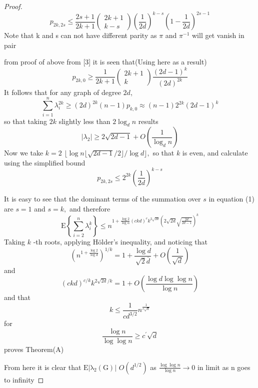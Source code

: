 \documentclass[oneside]{book}
\begin{document}
\begin{proof}
$$
p_{2 k, 2 s} \leq \frac{2 s+1}{2 k+1}\left(\begin{array}{c}
2 k+1 \\
k-s
\end{array}\right)\left(\frac{1}{2 d}\right)^{k-s}\left(1-\frac{1}{2 d}\right)^{2 s-1}
$$
 Note that k and s can not have different parity as  $\pi$ and $\pi^{-1}$ will get vanish in pair\par
   from proof of above from [3] it is seen that(Using here as a result)  
$$ p_{2 k, 0} \geq \frac{1}{2 k+1}\left(\begin{array}{c}
2 k+1 \\
k
\end{array}\right) \frac{(2 d-1)^{k}}{(2 d)^{2 k}}$$
It follows that for any graph of degree $2 d$,
$$
\sum_{i=1}^{n} \lambda_{i}^{2 k} \geq(2 d)^{2 k}(n-1) p_{k, 0} \approx(n-1) 2^{2 k}(2 d-1)^{k}
$$
so that taking $2 k$ slightly less than $2 \log _{d} n$ results 
$$
\left|\lambda_{2}\right| \geq 2 \sqrt{2 d-1}+O\left(\frac{1}{\log _{d} n}\right)
$$
Now we take $k=2$ $\lfloor\log n\lfloor\sqrt{2 d-1} / 2\rfloor / \log d\rfloor,$ so that $k$ is even, and calculate
using the simplified bound
$$
p_{2 k, 2 s} \leq 2^{2 k}\left(\frac{1}{2 d}\right)^{k-s}
$$

It is easy to see that the dominant terms of the summation over $s$ in equation (1) are $s=1$ and $s=k,$ and therefore
$$
\mathrm{E}\left\{\sum_{i=2}^{n} \lambda_{i}^{k}\right\} \leq n^{1+\frac{\log 2}{\log \alpha}(c k d)^{c} k^{2 \sqrt{2 d}}(2 \sqrt{2 d} \sqrt{\frac{2 d}{2 d-1}})^{k}}
$$
Taking $k$ -th roots, applying Hölder's  inequality, and noticing that
$$
\left(n^{1+\frac{\log 2}{\log d}}\right)^{1 / k}=1+\frac{\log d}{\sqrt{2} \bar{d}}+O\left(\frac{1}{\sqrt{d}}\right)
$$
and 
$$
(c k d)^{c / k} k^{2 \sqrt{2 d} / k}=1+O\left(\frac{\log d \log \log n}{\log n}\right)
$$
and that
$$
k \leq \frac{1}{c d^{3 / 2}} n^{\frac{1}{c \sqrt{a}}}
$$
for
$$
\frac{\log n}{\log \log n} \geq c^{\prime} \sqrt{d}
$$
proves Theorem(A)  \par 

From here it is clear that $\mathrm{E|\lambda_{2}(G)|}$ \leq $O(d^{1/2})$ as $\frac{ \log \log n}{\log n}\rightarrow 0$ in limit  as n goes to  infinity 
\end{proof} 
\end{document}
